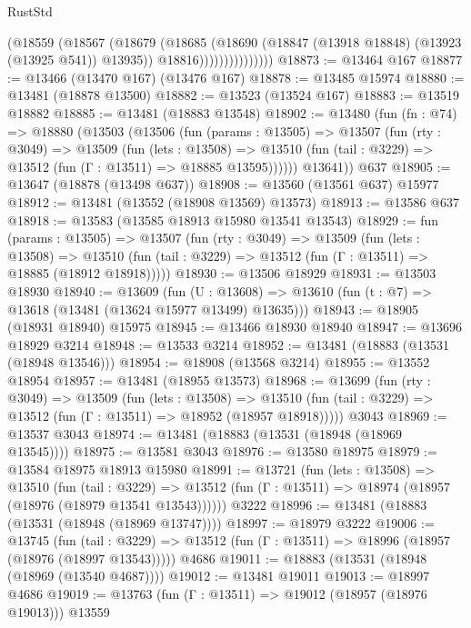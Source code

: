 \begin{lexlean}{RustStd}
\begin{coremodule}
                          (@18559
                            (@18567
                              (@18679
                                (@18685
                                  (@18690 (@18847 (@13918 @18848) (@13923 (@13925 @541)) @13935))
                                  @18816)))))))))))))))
@18873 := @13464 @167
@18877 := @13466 (@13470 @167) (@13476 @167)
@18878 := @13485 @15974
@18880 := @13481 (@18878 @13500)
@18882 := @13523 (@13524 @167)
@18883 := @13519 @18882
@18885 := @13481 (@18883 @13548)
@18902 := @13480
    (fun (fn : @74) =>
    @18880
      (@13503
        (@13506
          (fun (params : @13505) =>
          @13507
            (fun (rty : @3049) =>
            @13509
              (fun (lets : @13508) =>
              @13510 (fun (tail : @3229) => @13512 (fun (Γ : @13511) => @18885 @13595))))))
        @13641))
    @637
@18905 := @13647 (@18878 (@13498 @637))
@18908 := @13560 (@13561 @637) @15977
@18912 := @13481 (@13552 (@18908 @13569) @13573)
@18913 := @13586 @637
@18918 := @13583 (@13585 @18913 @15980 @13541 @13543)
@18929 := fun (params : @13505) =>
  @13507
    (fun (rty : @3049) =>
    @13509
      (fun (lets : @13508) =>
      @13510 (fun (tail : @3229) => @13512 (fun (Γ : @13511) => @18885 (@18912 @18918)))))
@18930 := @13506 @18929
@18931 := @13503 @18930
@18940 := @13609
    (fun (U : @13608) => @13610 (fun (t : @7) => @13618 (@13481 (@13624 @15977 @13499) @13635)))
@18943 := @18905 (@18931 @18940) @15975
@18945 := @13466 @18930 @18940
@18947 := @13696 @18929 @3214
@18948 := @13533 @3214
@18952 := @13481 (@18883 (@13531 (@18948 @13546)))
@18954 := @18908 (@13568 @3214)
@18955 := @13552 @18954
@18957 := @13481 (@18955 @13573)
@18968 := @13699
    (fun (rty : @3049) =>
    @13509
      (fun (lets : @13508) =>
      @13510 (fun (tail : @3229) => @13512 (fun (Γ : @13511) => @18952 (@18957 @18918)))))
    @3043
@18969 := @13537 @3043
@18974 := @13481 (@18883 (@13531 (@18948 (@18969 @13545))))
@18975 := @13581 @3043
@18976 := @13580 @18975
@18979 := @13584 @18975 @18913 @15980
@18991 := @13721
    (fun (lets : @13508) =>
    @13510
      (fun (tail : @3229) =>
      @13512 (fun (Γ : @13511) => @18974 (@18957 (@18976 (@18979 @13541 @13543))))))
    @3222
@18996 := @13481 (@18883 (@13531 (@18948 (@18969 @13747))))
@18997 := @18979 @3222
@19006 := @13745
    (fun (tail : @3229) => @13512 (fun (Γ : @13511) => @18996 (@18957 (@18976 (@18997 @13543)))))
    @4686
@19011 := @18883 (@13531 (@18948 (@18969 (@13540 @4687))))
@19012 := @13481 @19011
@19013 := @18997 @4686
@19019 := @13763 (fun (Γ : @13511) => @19012 (@18957 (@18976 @19013))) @13559

\end{coremodule}
\end{lexlean}
